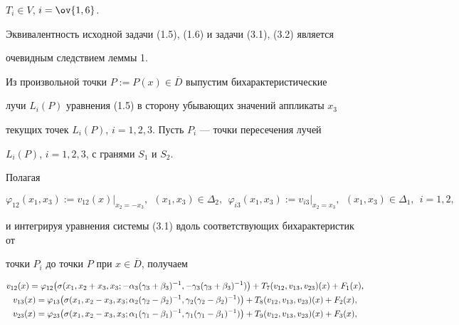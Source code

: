 $T_i \in V$, $i=\ov{1,6}$.





Эквивалентность исходной задачи (1.5), (1.6) и задачи (3.1), (3.2) является


очевидным следствием леммы 1.





Из произвольной точки $P:=P(x) \in \overline D$ выпустим бихарактеристические


лучи $L_i(P)$ уравнения (1.5) в сторону убывающих значений аппликаты $x_3$


текущих точек $L_i(P)$, $i=1,2,3$. Пусть $P_i$ --- точки пересечения лучей


$L_i(P)$, $i=1,2,3$, с гранями $S_1$ и $S_2$.





Полагая


$$


\varphi_{12}(x_1,x_3):=v_{12}(x){\big |}_{x_2=-x_3},\ \ (x_1,x_3) \in


\Delta_2,\ \ \varphi_{i3}(x_1,x_3):=v_{i3}{\big|}_{x_2=x_3},\ \ (x_1,x_3)


\in \Delta_1,\ \ i=1,2,


$$


и интегрируя уравнения системы (3.1) вдоль соответствующих бихарактеристик от


точки $P_i$ до точки $P$ при $ x \in \overline D$, получаем




\begin{gather}


v_{12}(x)=\varphi_{12}\big (\sigma(x_1,x_2+x_3,x_3;-\alpha_3(\gamma_3+


\beta_3)^{-1},-\gamma_3(\gamma_3+\beta_3)^{-1}) \big )+T_7(v_{12},v_{13},


v_{23})(x)+F_1(x),\notag \\


v_{13}(x)=\varphi_{13}\big (\sigma(x_1,x_2-x_3,x_3;\alpha_2(\gamma_2-


\beta_2)^{-1},\gamma_2(\gamma_2-\beta_2)^{-1}) \big )+T_8(v_{12},v_{13},


v_{23})(x)+F_2(x),\\


v_{23}(x) = \varphi_{23} \big (\sigma(x_1,x_2-x_3,x_3;\alpha_1(\gamma_1-


\beta_1)^{-1},\gamma_1(\gamma_1-\beta_1)^{-1}) \big )+T_9(v_{12},v_{13},


v_{23})(x)+F_3(x),\notag


\end{gather}


